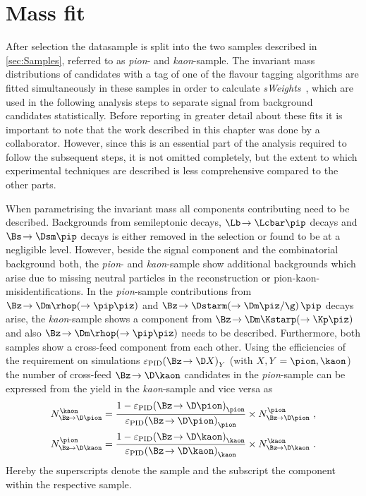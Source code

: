 \chapter{Mass fit}
\label{ch:massfit}

\linespread{1.08}\selectfont
After selection the datasample is split into the two samples described in \cref{sec:Samples}, referred to as \emph{pion}- and \emph{kaon}-sample.
The invariant \Bz mass distributions of candidates with a tag of one of the flavour tagging algorithms are fitted simultaneously in these samples in order to calculate \emph{sWeights}~\cite{Pivk:2004ty}, which are used in the following analysis steps to separate signal from background candidates statistically.
Before reporting in greater detail about these fits it is important to note that the work described in this chapter was done by a collaborator.
However, since this is an essential part of the analysis required to follow the subsequent steps, it is not omitted completely, but the extent to which \eg experimental techniques are described is less comprehensive compared to the other parts.

When parametrising the invariant \Bz mass all components contributing need to be described. Backgrounds from semileptonic decays, $\Lb\!\to\Lcbar\pip$ decays and $\Bs\!\to\Dsm\pip$ decays is either removed in the selection or found to be at a negligible level.
However, beside the signal component and the combinatorial background both, the \emph{pion}- and \emph{kaon}-sample show additional backgrounds which arise due to missing neutral particles in the reconstruction or pion-kaon-misidentifications.
In the \emph{pion}-sample contributions from $\Bz\!\to\Dm\rhop\!\left(\to\pip\piz\right)$ and $\Bz\!\to\Dstarm\!\left(\to\Dm\piz/\g\right)\pip$ decays arise, the \emph{kaon}-sample shows a component from $\Bz\!\to\Dm\Kstarp\!\left(\to\Kp\piz\right)$ and also $\Bz\!\to\Dm\rhop\!\left(\to\pip\piz\right)$  needs to be described.
Furthermore, both samples show a cross-feed component from each other.
Using the efficiencies of the \dllkpi requirement on simulations $\varepsilon_{\text{PID}}\!\left(\Bz\!\to\D X\right)_Y$ (with $X, Y=\pion, \kaon$) the number of cross-feed $\Bz\!\to\D\kaon$ candidates in the \emph{pion}-sample can be expressed from the yield in the \emph{kaon}-sample and vice versa as
\begin{equation}
\begin{aligned}
N_{\Bz\!\to\D\pion}^{\kaon}&=\frac{1-\varepsilon_{\text{PID}}\!\left(\Bz\!\to\D \pion\right)_{\pion}}{\varepsilon_{\text{PID}}\!\left(\Bz\!\to\D \pion\right)_{\pion}}\times N_{\Bz\!\to\D\pion}^{\pion} \,\,,\\
N_{\Bz\!\to\D\kaon}^{\pion}&=\frac{1-\varepsilon_{\text{PID}}\!\left(\Bz\!\to\D \kaon\right)_{\kaon}}{\varepsilon_{\text{PID}}\!\left(\Bz\!\to\D \kaon\right)_{\kaon}}\times N_{\Bz\!\to\D\kaon}^{\kaon}\,\,.\label{eq:ConstrainCrossFeed}
\end{aligned}
\end{equation}
Hereby the superscripts denote the sample and the subscript the component within the respective sample.

